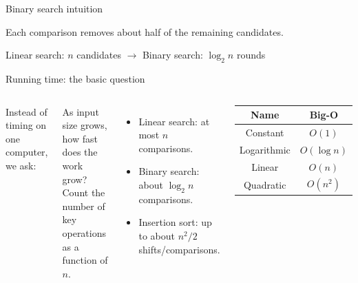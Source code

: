 \documentclass[11pt,aspectratio=43]{beamer}
\begin{document}
\begin{frame}{Binary search intuition}
\begin{center}
\end{center}

\vspace{0.5em}
Each comparison removes about half of the remaining candidates.

\vspace{0.5em}
\begin{center}
  Linear search: $n$ candidates $\rightarrow$ Binary search: $\log_2 n$ rounds
\end{center}
\end{frame}

\begin{frame}{Running time: the basic question}
\begin{columns}[T]
    Instead of timing on one computer, we ask:
    \begin{block}{As input size grows, how fast does the work grow?}
      Count the number of key operations as a function of $n$.
    \end{block}
    \begin{itemize}
      \item Linear search: at most $n$ comparisons.
      \item Binary search: about $\log_2 n$ comparisons.
      \item Insertion sort: up to about $n^2/2$ shifts/comparisons.
    \end{itemize}
    \begin{center}
    \begin{tabular}{cc}
      \toprule
      Name & Big-O \\
      \midrule
      Constant    & $O(1)$ \\
      Logarithmic & $O(\log n)$ \\
      Linear      & $O(n)$ \\
      Quadratic   & $O(n^2)$ \\
      \bottomrule
    \end{tabular}
    \end{center}
\end{columns}
\end{frame}
\end{document}
